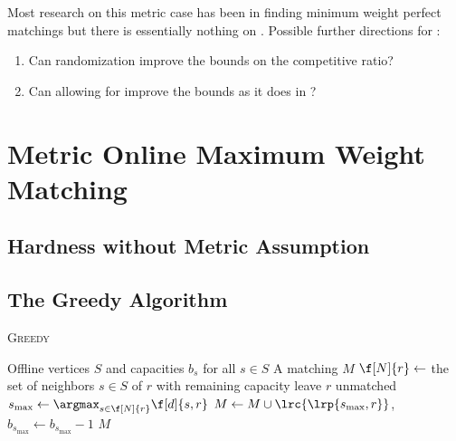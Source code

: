 \noindent Most research on this metric case has been in finding minimum weight perfect matchings but there is essentially nothing on \momwm{}. 
Possible further directions for \momwm{}:
\begin{enumerate}
    \item Can randomization improve the bounds on the competitive ratio?
    \item Can allowing for \bmatch{} improve the bounds as it does in \omm{}?
\end{enumerate} 

\section{Metric Online Maximum Weight Matching}

\subsection{Hardness without Metric Assumption}
\label{subsec:hardness}

\subsection{The Greedy Algorithm}

\newcommand{\greedy}{\hyperref[alg:greedy]{\textsc{Greedy}}}

\begin{algorithm}[!h]
    \caption{\textsc{Greedy}} \label{alg:greedy}
    \begin{algorithmic}[1]
        \AlgIn Offline vertices $S$ and capacities $b_s$ for all $s \in S$
        \AlgOut A matching $M$
            \State $\f[N]{r} \gets$ the set of neighbors $s \in S$ of $r$ with remaining capacity
                \State leave $r$ unmatched
            \Else 
                \State $s_{\max} \gets \argmax_{s \in \f[N]{r}} \f[d]{s, r}$
                \State $M \gets M \cup \lrc{\lrp{s_{\max}, r}}$, $b_{s_{\max}} \gets b_{s_{\max}} - 1$
            \EndIf
        \EndWhile
        \Return $M$
    \end{algorithmic}
\end{algorithm}

